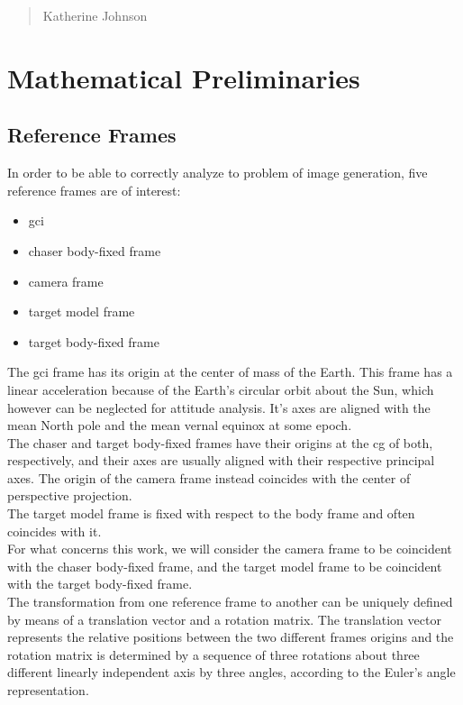 \begin{quotation}
{\footnotesize
{}
\begin{flushright}
Katherine Johnson
\end{flushright}
}
\end{quotation}
\vspace{0.5cm}

\section{Mathematical Preliminaries}

\subsection{Reference Frames}
In order to be able to correctly analyze to problem of image generation, five reference frames are of interest:
\begin{itemize}
\item \acrfull{gci}
\item chaser body-fixed frame
\item camera frame
\item target model frame
\item target body-fixed frame
\end{itemize}

The \acrshort{gci} frame has its origin at the center of mass of the Earth. This frame has a linear acceleration because of the Earth's circular orbit about the Sun, which however can be neglected for attitude analysis.
It's axes are aligned with the mean North pole and the mean vernal equinox at some epoch.\\
The chaser and target body-fixed frames have their origins at the \acrshort{cg} of both, respectively, and their axes are usually aligned with their respective principal axes.
The origin of the camera frame instead coincides with the center of perspective projection.\\
The target model frame is fixed with respect to the body frame and often coincides with it.\\
For what concerns this work, we will consider the camera frame to be coincident with the chaser body-fixed frame, and the target model frame to be coincident with the target body-fixed frame.\\
The transformation from one reference frame to another can be uniquely defined by means of a translation vector and a rotation matrix. The translation vector represents the relative positions between the two different frames origins and the rotation matrix is determined by a sequence of three rotations about three different linearly independent axis by three angles, according to the Euler's angle representation.


